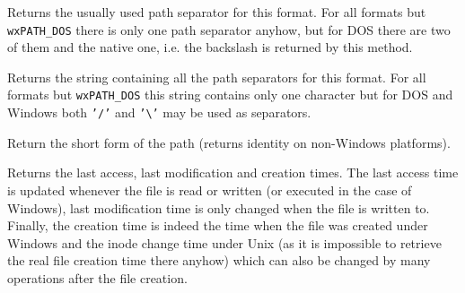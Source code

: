 \twocolwidtha{5cm}
\begin{twocollist}\itemsep=0pt
\end{twocollist}


\label{wxfilenamegetpathseparator}


Returns the usually used path separator for this format. For all formats but 
{\tt wxPATH\_DOS} there is only one path separator anyhow, but for DOS there
are two of them and the native one, i.e. the backslash is returned by this
method.




\label{wxfilenamegetpathseparators}


Returns the string containing all the path separators for this format. For all
formats but {\tt wxPATH\_DOS} this string contains only one character but for
DOS and Windows both {\tt '/'} and {\tt '\textbackslash'} may be used as
separators.




\label{wxfilenamegetshortpath}


Return the short form of the path (returns identity on non-Windows platforms).


\label{wxfilenamegettimes}


Returns the last access, last modification and creation times. The last access
time is updated whenever the file is read or written (or executed in the case
of Windows), last modification time is only changed when the file is written
to. Finally, the creation time is indeed the time when the file was created
under Windows and the inode change time under Unix (as it is impossible to
retrieve the real file creation time there anyhow) which can also be changed
by many operations after the file creation.

